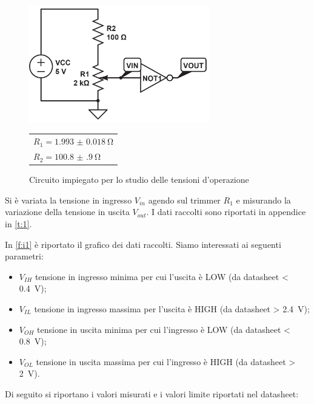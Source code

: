 \documentclass[a4paper,11pt]{article}
\begin{document}
\begin{figure}[H]
	\begin{minipage}{0.7\textwidth}
		\centering
		\includegraphics[width=0.7\textwidth]{immagine1.jpg}
		\caption{Circuito impiegato per lo studio delle tensioni d'operazione}
		\label{f:c1}
	\end{minipage}
	\begin{minipage}{0.3\textwidth}
		\begin{tabular}{l}
			$R_1 = \SI{1.993(18)}{\ohm}$\\
			$R_2 = \SI{100.8(9)}{\ohm}$
		\end{tabular}
	\end{minipage}
\end{figure}

Si è variata la tensione in ingresso $V_{in}$ agendo sul trimmer $R_1$ e misurando la variazione della tensione in uscita $V_{out}$. I dati raccolti sono riportati in appendice in \tablename{ \ref{t:1}}.

In \figurename{ \ref{f:i1}} è riportato il grafico dei dati raccolti.
Siamo interessati ai seguenti parametri:
\begin{itemize}
\item $V_{IH}$ tensione in ingresso minima per cui  l'uscita è LOW (da datasheet < \SI{0.4}{\volt});
\item $V_{IL}$ tensione in ingresso massima per  l'uscita è HIGH (da datasheet > \SI{2.4}{\volt});
\item $V_{OH}$ tensione in uscita minima per cui l'ingresso è LOW (da datasheet < \SI{0.8}{\volt});
\item $V_{OL}$ tensione in uscita massima per cui  l'ingresso è HIGH (da datasheet > \SI{2}{\volt}).
\end{itemize}

Di seguito si riportano i valori misurati e i valori limite riportati nel datasheet:
\end{document}
